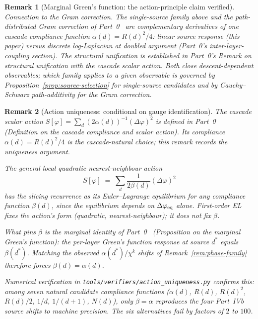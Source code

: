 \documentclass[12pt,a4paper]{article}
\newtheorem*{remark}{Remark}
\begin{document}
\begin{remark}[Marginal Green's function: the action-principle claim verified]
\emph{Connection to the Gram correction.} The single-source family above and
the path-distributed Gram correction of Part~0~\cite{part0}
are complementary derivatives of one cascade compliance function $\alpha(d) =
R(d)^2/4$: linear source response (this paper) versus discrete log-Laplacian
at doubled argument (Part~0's inter-layer-coupling section). The structural
unification is established in Part~0's Remark on structural unification with
the cascade scalar action. Both close descent-dependent observables; which
family applies to a given observable is governed by
Proposition~\ref{prop:source-selection} for single-source candidates and by
Cauchy--Schwarz path-additivity for the Gram correction.
\end{remark}

\begin{remark}[Action uniqueness: conditional on gauge identification]
\label{rem:action-uniqueness}
The cascade scalar action $S[\varphi] = \sum_d (2\alpha(d))^{-1}(\Delta\varphi)^2$
is defined in Part~0~\cite{part0} (Definition on the cascade
compliance and scalar action). Its compliance $\alpha(d) = R(d)^2/4$ is the
cascade-natural choice; this remark records the uniqueness argument.

The general local quadratic nearest-neighbour action
\[
S[\varphi] \;=\; \sum_d \frac{1}{2\beta(d)}(\Delta\varphi)^2
\]
has the slicing recurrence as its Euler--Lagrange equilibrium for any
compliance function $\beta(d)$, since the equilibrium depends on
$\Delta\varphi_{\rm eq}$ alone. First-order EL fixes the action's form
(quadratic, nearest-neighbour); it does not fix $\beta$.

What pins $\beta$ is the marginal identity of Part~0~\cite{part0}
(Proposition on the marginal Green's function): the per-layer Green's function
response at source $d^*$ equals $\beta(d^*)$. Matching the observed
$\alpha(d^*)/\chi^k$ shifts of Remark~\ref{rem:phase-family} therefore forces
$\beta(d) = \alpha(d)$.

Numerical verification in \texttt{tools/verifiers/action\_uniqueness.py} confirms this:
among seven natural candidate compliance functions ($\alpha(d)$, $R(d)$,
$R(d)^2$, $R(d)/2$, $1/d$, $1/(d{+}1)$, $N(d)$), only $\beta = \alpha$
reproduces the four Part~IVb source shifts to machine precision. The six
alternatives fail by factors of $2$ to $100$.


\end{remark}
\end{document}
